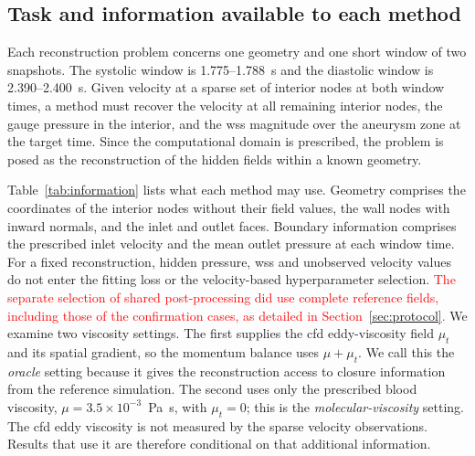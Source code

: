 \documentclass[12pt,a4paper]{article}
\newcommand{\cfdrevision}[1]{\textcolor{red}{#1}}
\newcommand{\CFD}{\ac{cfd}\xspace}
\newcommand{\WSS}{\ac{wss}\xspace}
\theoremstyle{definition}
\numberwithin{equation}{section}
\begin{document}
\subsection{Task and information available to each method}
\label{sec:task}
Each reconstruction problem concerns one geometry and one short window of two snapshots. %
The systolic window is 1.775--1.788~s and the diastolic window is 2.390--2.400~s. Given velocity at a sparse set of interior nodes at both window times, a method must recover the velocity at all remaining interior nodes, the gauge pressure in the interior, and the \WSS magnitude over the aneurysm zone at the target time. Since the computational domain is prescribed, the problem is posed as the reconstruction of the hidden fields within a known geometry.

Table~\ref{tab:information} lists what each method may use. Geometry comprises the coordinates of the interior nodes without their field values, the wall nodes with inward normals, and the inlet and outlet faces. Boundary information comprises the prescribed inlet velocity and the mean outlet pressure at each window time. For a fixed reconstruction, hidden pressure, \WSS and unobserved velocity values do not enter the fitting loss or the velocity-based hyperparameter selection. \cfdrevision{The separate selection of shared post-processing did use complete reference fields, including those of the confirmation cases, as detailed in Section~\ref{sec:protocol}.} We examine two viscosity settings. The first supplies the \CFD eddy-viscosity field $\mu_t$ and its spatial gradient, so the momentum balance uses $\mu+\mu_t$. We call this the \emph{oracle} setting because it gives the reconstruction access to closure information from the reference simulation. The second uses only the prescribed blood viscosity, $\mu=3.5\times10^{-3}$~Pa~s, with $\mu_t=0$; this is the \emph{molecular-viscosity} setting. The \CFD eddy viscosity is not measured by the sparse velocity observations. Results that use it are therefore conditional on that additional information.
\end{document}
